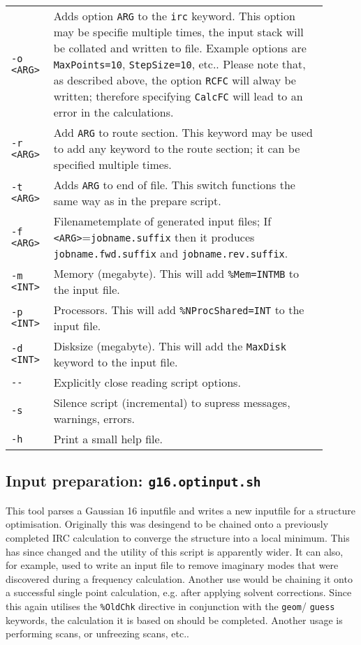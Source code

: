 \documentclass[   %
  final,          %
  a4paper         %
]{article}
\begin{document}
\begin{longtable}{p{0.1\linewidth}p{0.8\linewidth}}
  {\lstinline`-o <ARG>`} & Adds option {\lstinline`ARG`} to the \texttt{irc} keyword. 
    This option may be specifie multiple times, the input stack will be collated and written to file.
    Example options are \texttt{MaxPoints=10}, \texttt{StepSize=10}, etc.. 
    Please note that, as described above, the option \texttt{RCFC} will alway be written;
    therefore specifying \texttt{CalcFC} will lead to an error in the calculations.\\
  {\lstinline`-r <ARG>`} & Add {\lstinline`ARG`} to route section. 
    This keyword may be used to add any keyword to the route section; 
    it can be specified multiple times.\\
  {\lstinline`-t <ARG>`} & Adds {\lstinline`ARG`} to end of file. 
    This switch functions the same way as in the prepare script. \\
  {\lstinline`-f <ARG>`} & Filenametemplate of generated input files; %
    If {\lstinline`<ARG>`=}\texttt{jobname.suffix} then it produces \texttt{jobname.fwd.suffix} and \texttt{jobname.rev.suffix}. \\
  {\lstinline`-m <INT>`} & Memory (megabyte). This will add \texttt{\%Mem={\lstinline`INT`}MB} to the input file. \\
  {\lstinline`-p <INT>`} & Processors. This will add \texttt{\%NProcShared={\lstinline`INT`}} to the input file. \\
  {\lstinline`-d <INT>`} & Disksize (megabyte). This will add the \texttt{MaxDisk} keyword to the input file. \\
  {\lstinline`--`}       & Explicitly close reading script options. \\
  {\lstinline`-s`}       & Silence script (incremental) to supress messages, warnings, errors. \\
  {\lstinline`-h`}       & Print a small help file. \\
\end{longtable}

\subsection{Input preparation: \texorpdfstring{{\lstinline`g16.optinput.sh`}}{g16.optinput.sh}}

This tool parses a Gaussian 16 inputfile and writes a new inputfile for a structure optimisation.
Originally this was desingend to be chained onto a previously completed IRC calculation
to converge the structure into a local minimum.
This has since changed and the utility of this script is apparently wider.
It can also, for example, used to write an input file to remove imaginary modes that were 
discovered during a frequency calculation.
Another use would be chaining it onto a successful single point calculation,
e.g. after applying solvent corrections.
Since this again utilises the \texttt{\%OldChk} directive in conjunction with 
the \texttt{geom}/ \texttt{guess} keywords, the calculation it is based on should be completed.
Another usage is performing scans, or unfreezing scans, etc..
\end{document}
